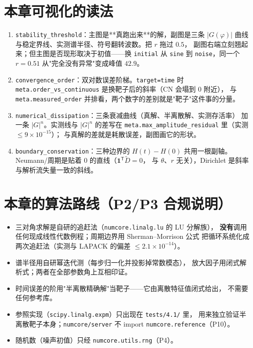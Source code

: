 \section{本章可视化的读法}

\begin{enumerate}
  \item \texttt{stability\_threshold}：主图是**真跑出来**的解，副图是三条 $|G(\varphi)|$
        曲线与稳定界线、实测谱半径、符号翻转波数。把 $r$ 拖过 $0.5$，
        副图右端立刻翘起来；但主图是否现形取决于初值——换 \texttt{initial}
        从 \texttt{sine} 到 \texttt{noise}，同一个 $r=0.51$ 从"完全没有异常"变成峰值 $42.9$。
  \item \texttt{convergence\_order}：双对数误差阶梯。\texttt{target=time} 时
        \texttt{meta.order\_vs\_continuous} 是换靶子后的斜率（CN 会塌到 $0$ 附近），
        与 \texttt{meta.measured\_order} 并排看，两个数字的差别就是"靶子"这件事的分量。
  \item \texttt{numerical\_dissipation}：三条衰减曲线（真解、半离散解、实测存活率）
        加一条 $|G|^n$。实测线与 $|G|^n$ 的差写在
        \texttt{meta.max\_amplitude\_residual} 里（实测 $\le9\times10^{-15}$）；
        与真解的差就是耗散误差，副图画它的形状。
  \item \texttt{boundary\_conservation}：三种边界的 $H(t)-H(0)$ 共用一根副轴。
        Neumann/周期是贴着 $0$ 的直线（$\mathbf 1^{\mathsf T}\tilde D=0$，
        与 $\theta$、$r$ 无关），Dirichlet 是斜率与解析流失量一致的斜线。
\end{enumerate}

\section{本章的算法路线（P2/P3 合规说明）}

\begin{itemize}
  \item 三对角求解是自研的追赶法（\texttt{numcore.linalg.lu} 的 LU 分解族），
        \textbf{没有}调用任何现成线性代数例程；周期边界用 Sherman--Morrison 公式
        把循环系统化成两次追赶法（实测与 LAPACK 的偏差 $\le2.1\times10^{-14}$）。
  \item 谱半径用自研幂迭代测（每步归一化并投影掉常数模态），
        放大因子用闭式解析式；两者在全部参数角上互相印证。
  \item 时间误差的阶用"半离散精确解"当靶子——它由离散特征值闭式给出，
        不需要任何参考库。
  \item 参照实现（\texttt{scipy.linalg.expm}）只出现在 \texttt{tests/4.1/} 里，
        用来独立验证半离散靶子本身；\texttt{numcore/server} 不 import
        \texttt{numcore.reference}（P10）。
  \item 随机数（噪声初值）只经 \texttt{numcore.utils.rng}（P4）。
\end{itemize}

